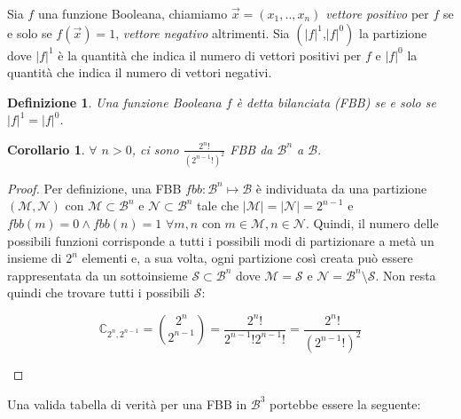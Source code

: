 \documentclass[12pt,a4paper,openright]{report}
\newtheorem{mydef}{Definizione}[chapter]
\newtheorem*{mycor}{Corollario}
\begin{document}
Sia $f$ una funzione Booleana, chiamiamo $\vec{x}=(x_1,..,x_n)$ \textit{vettore positivo} per $f$ se e solo se
$f(\vec{x}) = 1$, \textit{vettore negativo} altrimenti. Sia $({\left\vert{f}\right\vert}^1 \text{,} {\left\vert{f}\right\vert}^0)$ la partizione dove ${\left\vert{f}\right\vert}^1$ è la quantità che indica il numero di vettori
positivi per $f$ e ${\left\vert{f}\right\vert}^0$ la quantità che indica il numero di vettori negativi.
\begin{mydef}
    Una funzione Booleana $f$ è detta bilanciata (FBB) se e solo se ${\left\vert{f}\right\vert}^1 = {\left\vert{f}\right\vert}^0$.
\end{mydef}
\begin{mycor}
    $\forall$ $n > 0$, ci sono $\frac{2^{n}!}{(2^{n-1}!)^2}$ FBB da $\mathcal{B}^n$ a $\mathcal{B}.$
\end{mycor}
\begin{proof}
    Per definizione, una FBB $fbb:\mathcal{B}^n\mapsto\mathcal{B}$ è individuata da una partizione $(\mathcal{M},\mathcal{N})$ con $\mathcal{M}\subset\mathcal{B}^n$ e $\mathcal{N}\subset\mathcal{B}^n$ tale che
    $\left\vert{\mathcal{M}}\right\vert = \left\vert{\mathcal{N}}\right\vert = 2^{n-1}$ e $fbb(m)=0 \land fbb(n)=1$ $\forall{m,n}$ con $m\in\mathcal{M},n\in\mathcal{N}$.
    Quindi, il numero delle possibili funzioni corrisponde a tutti i possibili modi di partizionare a metà un insieme di $2^n$ elementi e, a sua volta, ogni partizione così creata può essere rappresentata 
    da un sottoinsieme $\mathcal{S}\subset\mathcal{B}^n$ dove $\mathcal{M}=\mathcal{S}$ e $\mathcal{N}=\mathcal{B}^n \setminus \mathcal{S}$.
    Non resta quindi che trovare tutti i possibili $\mathcal{S}$:  
    \begin{center}
    \[
        \mathbb{C}_{2^n,2^{n-1}}= \binom{2^n}{2^{n-1}} = \frac{2^n!}{2^{n-1}!2^{n-1}!} = \frac{2^n!}{(2^{n-1}!)^2}
    \]
    \end{center}
\end{proof}
Una valida tabella di verità per una FBB in $\mathcal{B}^3$ portebbe essere la seguente:
\end{document}
